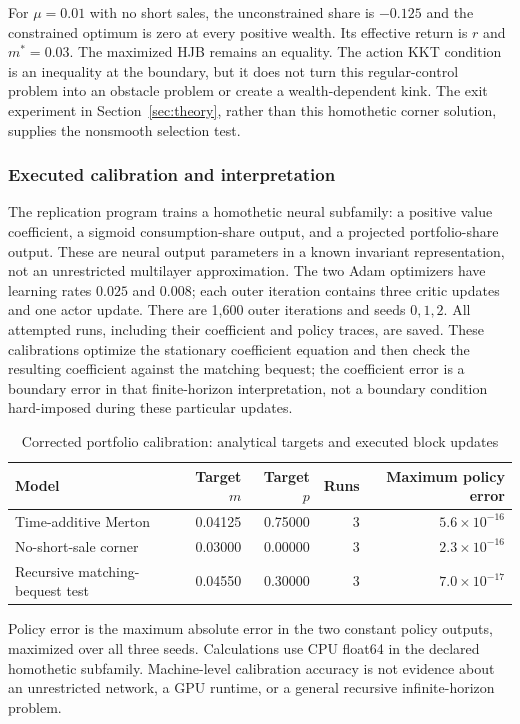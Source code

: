 \documentclass[ecta,nameyear,draft]{econsocart}
\theoremstyle{definition}
\theoremstyle{remark}
\begin{document}
For $\mu=0.01$ with no short sales, the unconstrained share is $-0.125$ and the constrained optimum is zero at every positive wealth. Its effective return is $r$ and $m^*=0.03$. The maximized HJB remains an equality. The action KKT condition is an inequality at the boundary, but it does not turn this regular-control problem into an obstacle problem or create a wealth-dependent kink. The exit experiment in Section~\ref{sec:theory}, rather than this homothetic corner solution, supplies the nonsmooth selection test.

\subsubsection{Executed calibration and interpretation}
The replication program trains a homothetic neural subfamily: a positive value coefficient, a sigmoid consumption-share output, and a projected portfolio-share output. These are neural output parameters in a known invariant representation, not an unrestricted multilayer approximation. The two Adam optimizers have learning rates $0.025$ and $0.008$; each outer iteration contains three critic updates and one actor update. There are 1,600 outer iterations and seeds $0,1,2$. All attempted runs, including their coefficient and policy traces, are saved. These calibrations optimize the stationary coefficient equation and then check the resulting coefficient against the matching bequest; the coefficient error is a boundary error in that finite-horizon interpretation, not a boundary condition hard-imposed during these particular updates.

\begin{table}[t]
\centering
\caption{Corrected portfolio calibration: analytical targets and executed block updates}\label{tab:portfolio}
\begin{tabular}{lrrrr}
\toprule
Model & Target $m$ & Target $p$ & Runs & Maximum policy error\\
\midrule
Time-additive Merton & 0.04125 & 0.75000 & 3 & $5.6\times10^{-16}$\\
No-short-sale corner & 0.03000 & 0.00000 & 3 & $2.3\times10^{-16}$\\
Recursive matching-bequest test & 0.04550 & 0.30000 & 3 & $7.0\times10^{-17}$\\
\bottomrule
\end{tabular}
\par\smallskip\footnotesize Policy error is the maximum absolute error in the two constant policy outputs, maximized over all three seeds. Calculations use CPU float64 in the declared homothetic subfamily. Machine-level calibration accuracy is not evidence about an unrestricted network, a GPU runtime, or a general recursive infinite-horizon problem.
\end{table}
\end{document}
